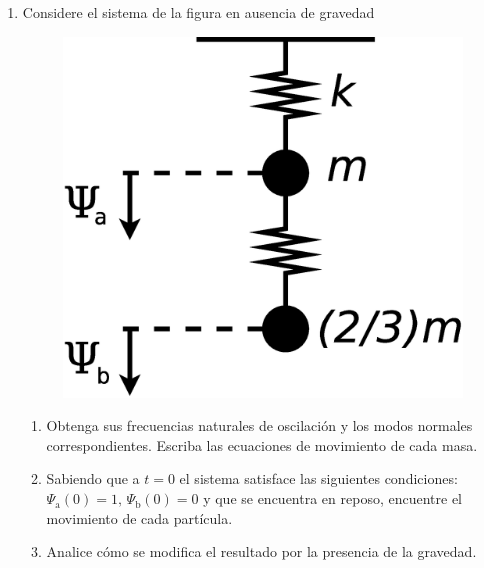 \documentclass[11pt,spanish]{article}
\begin{document}
\begin{enumerate}

    \section*{Sistemas con más de un grado de libertad}


    \item Considere el sistema de la figura en ausencia de gravedad

    \begin{figure}[H]
        \centering{}\includegraphics[clip,scale=0.25]{figs/ej1-6}
    \end{figure}

    \begin{enumerate}
        \item Obtenga sus frecuencias naturales de oscilación y los modos
        normales correspondientes. Escriba las ecuaciones de movimiento de cada
        masa.

        \item Sabiendo que a $t=0$ el sistema satisface las siguientes
        condiciones: $\Psi_\text{a}(0)=1,\,\Psi_\text{b}(0)=0$ y que se
        encuentra en reposo, encuentre el movimiento de cada partícula.

        \item Analice cómo se modifica el resultado por la presencia de la
        gravedad.
    \end{enumerate}


\end{enumerate}
\end{document}
